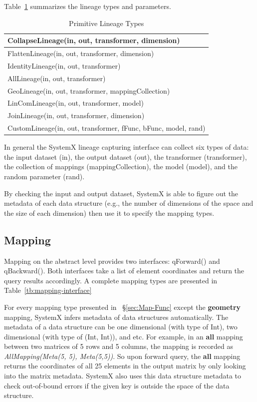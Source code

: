 \documentclass{sig-alternate}
\begin{document}
Table~\ref{tb:lineage-interface} summarizes the lineage types and parameters.
\begin{table}[t]
\begin{center}
    \caption{Primitive Lineage Types}
    \begin{scriptsize}
    \begin{tabular}{ | p{8cm}|}
    \hline
    CollapseLineage(in, out, transformer, dimension) \\ \hline 
    FlattenLineage(in, out, transformer, dimension) \\ \hline
    IdentityLineage(in, out, transformer) \\ \hline
    AllLineage(in, out, transformer) \\ \hline
    GeoLineage(in, out, transformer, mappingCollection) \\ \hline
    LinComLineage(in, out, transformer, model) \\ \hline
    JoinLineage(in, out, transformer, dimension) \\ \hline
    CustomLineage(in, out, transformer, fFunc, bFunc, model, rand) \\ \hline
    \end{tabular}
    \end{scriptsize}
    \label{tb:lineage-interface}
\end{center}   
\end{table}

In general the SystemX lineage capturing interface can collect six types of data: 
the input dataset (in), the output dataset (out), the transformer (transformer), 
the collection of mappings (mappingCollection), the model (model), and the random 
parameter (rand).

By checking the input and output dataset, SystemX is able to figure out the metadata of each data structure 
(e.g., the number of dimensions of the space and the size of each dimension) then use it to specify the mapping types.

\subsection{Mapping}
\label{sec:Design-Mapping}
Mapping on the abstract level provides two interfaces: qForward() and qBackward(). Both interfaces
take a list of element coordinates and return the query results accordingly.
A complete mapping types are presented in Table~\ref{tb:mapping-interface}

For every mapping type presented in ~\S\ref{sec:Map-Func} except the {\bf geometry} mapping, 
SystemX infers metadata of data structures automatically. 
The metadata  of a data structure can be one dimensional (with type of Int), two dimensional (with type of (Int, Int)), and etc.
For example, in an {\bf all} mapping between two matrices of 5 rows and 5 columns,
the mapping is recorded as {\it AllMapping(Meta(5, 5), Meta(5,5))}. 
So upon forward query, the {\bf all} mapping returns the coordinates of all 25 elements in the output matrix by only looking into the matrix metadata.
SystemX also uses this data structure metadata to check out-of-bound errors if the given key is outside the space of the data structure.
\end{document}
